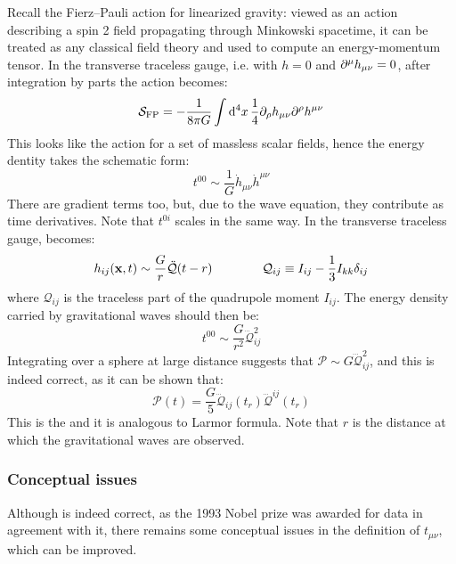 Recall the Fierz--Pauli action  for linearized gravity: viewed as an action describing a spin 2 field propagating through Minkowski spacetime, it can be treated as any classical field theory and used to compute an energy-momentum tensor. In the transverse traceless gauge, i.e. with $ h = 0 $ and $ \partial^\mu h_{\mu \nu} = 0 $, after integration by parts the action becomes:
\begin{equation*}
  \mathcal{S}_{\text{FP}} = - \frac{1}{8\pi G} \int \mathrm{d}^4 x\, \frac{1}{4} \partial_\rho h_{\mu \nu} \partial^\rho h^{\mu \nu}
\end{equation*}
This looks like the action for a set of massless scalar fields, hence the energy dentity takes the schematic form:
\begin{equation*}
  t^{00} \sim \frac{1}{G} \dot{h}_{\mu \nu} \dot{h}^{\mu \nu}
\end{equation*}
There are gradient terms too, but, due to the wave equation, they contribute as time derivatives. Note that $ t^{0i} $ scales in the same way. In the transverse traceless gauge,  becomes:
\begin{equation*}
  h_{ij}(\mathbf{x},t) \sim \frac{G}{r} \ddot{\mathcal{Q}}(t - r)
  \qquad \qquad
  \mathcal{Q}_{ij} \equiv I_{ij} - \frac{1}{3} I_{kk} \delta_{ij}
\end{equation*}
where $ \mathcal{Q}_{ij} $ is the traceless part of the quadrupole moment $ I_{ij} $. The energy density carried by gravitational waves should then be:
\begin{equation*}
  t^{00} \sim \frac{G}{r^2} \dddot{\mathcal{Q}}_{ij}^2
\end{equation*}
Integrating over a sphere at large distance suggests that $ \mathcal{P} \sim G \dddot{\mathcal{Q}}_{ij}^2 $, and this is indeed correct, as it can be shown that:
\begin{equation}
  \mathcal{P}(t) = \frac{G}{5} \dddot{\mathcal{Q}}_{ij}(t_r) \dddot{\mathcal{Q}}^{ij}(t_r)
  \label{eq:quadrupole-formula}
\end{equation}
This is the  and it is analogous to Larmor formula. Note that $ r $ is the distance at which the gravitational waves are observed.

\subsubsection{Conceptual issues}

Although  is indeed correct, as the 1993 Nobel prize was awarded for data in agreement with it, there remains some conceptual issues in the definition of $ t_{\mu \nu} $, which can be improved.

